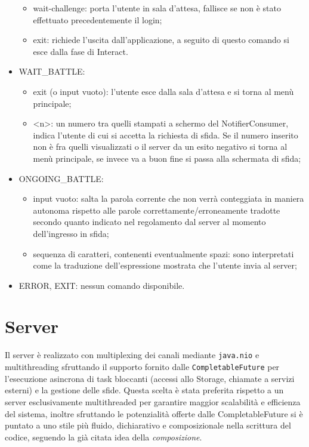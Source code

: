 \documentclass{article}
\begin{document}
\begin{itemize}
\begin{itemize}
            \item wait-challenge: porta l'utente in sala d'attesa, fallisce se non è stato effettuato precedentemente il login;
            \item exit: richiede l'uscita dall'applicazione, a seguito di questo comando si esce dalla fase di Interact.
        \end{itemize}
        \item WAIT\_BATTLE:
        \begin{itemize}
            \item exit (o input vuoto): l'utente esce dalla sala d'attesa e si torna al menù principale;
            \item <n>: un numero tra quelli stampati a schermo del NotifierConsumer, indica l'utente di cui si accetta la richiesta di sfida. Se il numero inserito non è fra quelli visualizzati o il server da un esito negativo si torna al menù principale, se invece va a buon fine si passa alla schermata di sfida;
        \end{itemize}
        \item ONGOING\_BATTLE:
        \begin{itemize}
            \item input vuoto: salta la parola corrente che non verrà conteggiata in maniera autonoma rispetto alle parole correttamente/erroneamente tradotte secondo quanto indicato nel regolamento dal server al momento dell'ingresso in sfida;
            \item sequenza di caratteri, contenenti eventualmente spazi: sono interpretati come la traduzione dell'espressione mostrata che l'utente invia al server;
        \end{itemize}
        \item ERROR, EXIT: nessun comando disponibile.
    \end{itemize}

    \section{Server}\label{server}
    Il server è realizzato con multiplexing dei canali mediante \texttt{java.nio} e multithreading sfruttando il supporto fornito dalle \texttt{CompletableFuture} per l'esecuzione asincrona di task bloccanti (accessi allo Storage, chiamate a servizi esterni) e la gestione delle sfide. Questa scelta è stata preferita rispetto a un server esclusivamente multithreaded per garantire maggior scalabilità e efficienza del sistema, inoltre sfruttando le potenzialità offerte dalle CompletableFuture si è puntato a uno stile più fluido, dichiarativo e composizionale nella scrittura del codice, seguendo la  già citata idea della \textit{composizione}.
\end{document}
